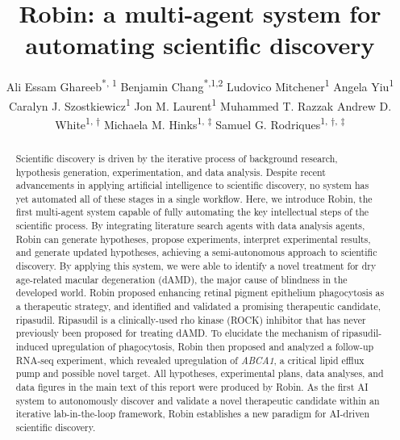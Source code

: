 \documentclass{article}
\title{Robin: a multi-agent system for automating scientific discovery}
\author{
  Ali Essam Ghareeb\textsuperscript{*, 1}
  \And
  Benjamin Chang\textsuperscript{*,1,2}
  \And
  Ludovico Mitchener\textsuperscript{1}
  \And
  Angela Yiu\textsuperscript{1}
  \And
  Caralyn J. Szostkiewicz\textsuperscript{1}
  \And
  Jon M. Laurent\textsuperscript{1}
  \And
  Muhammed T. Razzak %
  \And
  Andrew D. White\textsuperscript{1, $\dagger$}
  \And
  Michaela M. Hinks\textsuperscript{1, $\ddagger$}
  \And
  Samuel G. Rodriques\textsuperscript{1, $\dagger$, $\ddagger$}
}
\begin{document}
\maketitle


\begingroup %
\makeatletter
\renewcommand\@makefnmark{} %
\let\oldthefootnote\thefootnote
\renewcommand\thefootnote{} %


\let\thefootnote\oldthefootnote %
\makeatother
\endgroup





\begin{abstract}
Scientific discovery is driven by the iterative process of background research, hypothesis generation, experimentation, and data analysis. Despite recent advancements in applying artificial intelligence to scientific discovery, no system has yet automated all of these stages in a single workflow. Here, we introduce Robin, the first multi-agent system capable of fully automating the key intellectual steps of the scientific process. By integrating literature search agents with data analysis agents, Robin can generate hypotheses, propose experiments, interpret experimental results, and generate updated hypotheses, achieving a semi-autonomous approach to scientific discovery. By applying this system, we were able to identify a novel treatment for dry age-related macular degeneration (dAMD), the major cause of blindness in the developed world. Robin proposed enhancing retinal pigment epithelium phagocytosis as a therapeutic strategy, and identified and validated a promising therapeutic candidate, ripasudil. Ripasudil is a clinically-used rho kinase (ROCK) inhibitor that has never previously been proposed for treating dAMD. To elucidate the mechanism of ripasudil-induced upregulation of phagocytosis, Robin then proposed and analyzed a follow-up RNA-seq experiment, which revealed upregulation of \textit{ABCA1}, a critical lipid efflux pump and possible novel target. All hypotheses, experimental plans, data analyses, and data figures in the main text of this report were produced by Robin. As the first AI system to autonomously discover and validate a novel therapeutic candidate within an iterative lab-in-the-loop framework, Robin establishes a new paradigm for AI-driven scientific discovery.
\end{abstract}
\end{document}
